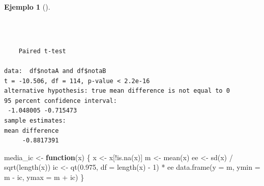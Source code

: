 \documentclass[
  spanish,
  a4paper,
]{scrreport}
\newenvironment{Shaded}{\begin{snugshade}}{\end{snugshade}}
\newcommand{\AttributeTok}[1]{\textcolor[rgb]{0.40,0.45,0.13}{#1}}
\newcommand{\ConstantTok}[1]{\textcolor[rgb]{0.56,0.35,0.01}{#1}}
\newcommand{\ControlFlowTok}[1]{\textcolor[rgb]{0.00,0.23,0.31}{\textbf{#1}}}
\newcommand{\DecValTok}[1]{\textcolor[rgb]{0.68,0.00,0.00}{#1}}
\newcommand{\FloatTok}[1]{\textcolor[rgb]{0.68,0.00,0.00}{#1}}
\newcommand{\FunctionTok}[1]{\textcolor[rgb]{0.28,0.35,0.67}{#1}}
\newcommand{\NormalTok}[1]{\textcolor[rgb]{0.00,0.23,0.31}{#1}}
\newcommand{\OtherTok}[1]{\textcolor[rgb]{0.00,0.23,0.31}{#1}}
\newcommand{\SpecialCharTok}[1]{\textcolor[rgb]{0.37,0.37,0.37}{#1}}
\newcommand{\StringTok}[1]{\textcolor[rgb]{0.13,0.47,0.30}{#1}}
\theoremstyle{definition}
\newtheorem{example}{Ejemplo}[chapter]
\theoremstyle{definition}
\theoremstyle{remark}
\begin{document}
\begin{example}[]\protect\hypertarget{exm-dospareadas-t-pareado}{}\label{exm-dospareadas-t-pareado}

~

\begin{Shaded}
\end{Shaded}

\begin{verbatim}

    Paired t-test

data:  df$notaA and df$notaB
t = -10.506, df = 114, p-value < 2.2e-16
alternative hypothesis: true mean difference is not equal to 0
95 percent confidence interval:
 -1.048005 -0.715473
sample estimates:
mean difference 
     -0.8817391 
\end{verbatim}

\begin{Shaded}
\begin{Highlighting}[]
\NormalTok{media\_ic }\OtherTok{\textless{}{-}} \ControlFlowTok{function}\NormalTok{(x) \{}
\NormalTok{  x }\OtherTok{\textless{}{-}}\NormalTok{ x[}\SpecialCharTok{!}\FunctionTok{is.na}\NormalTok{(x)]}
\NormalTok{  m }\OtherTok{\textless{}{-}} \FunctionTok{mean}\NormalTok{(x)}
\NormalTok{  ee }\OtherTok{\textless{}{-}} \FunctionTok{sd}\NormalTok{(x) }\SpecialCharTok{/} \FunctionTok{sqrt}\NormalTok{(}\FunctionTok{length}\NormalTok{(x))}
\NormalTok{  ic }\OtherTok{\textless{}{-}} \FunctionTok{qt}\NormalTok{(}\FloatTok{0.975}\NormalTok{, }\AttributeTok{df =} \FunctionTok{length}\NormalTok{(x) }\SpecialCharTok{{-}} \DecValTok{1}\NormalTok{) }\SpecialCharTok{*}\NormalTok{ ee}
  \FunctionTok{data.frame}\NormalTok{(}\AttributeTok{y =}\NormalTok{ m, }\AttributeTok{ymin =}\NormalTok{ m }\SpecialCharTok{{-}}\NormalTok{ ic, }\AttributeTok{ymax =}\NormalTok{ m }\SpecialCharTok{+}\NormalTok{ ic)}
\NormalTok{\}}


\end{Highlighting}
\end{Shaded}
\end{example}
\end{document}
